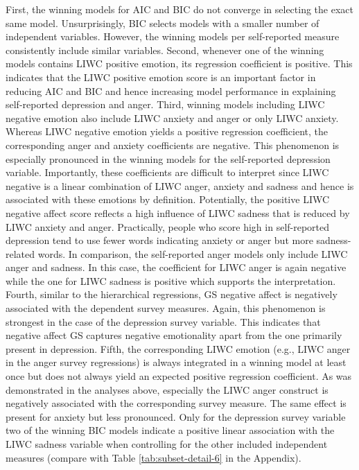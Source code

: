 \documentclass[
  english,
  jou,floatsintext]{apa7}
\begin{document}
First, the winning models for AIC and BIC do not converge in selecting the exact same model. Unsurprisingly, BIC selects models with a smaller number of independent variables. However, the winning models per self-reported measure consistently include similar variables. Second, whenever one of the winning models contains LIWC positive emotion, its regression coefficient is positive. This indicates that the LIWC positive emotion score is an important factor in reducing AIC and BIC and hence increasing model performance in explaining self-reported depression and anger.
Third, winning models including LIWC negative emotion also include LIWC anxiety and anger or only LIWC anxiety. Whereas LIWC negative emotion yields a positive regression coefficient, the corresponding anger and anxiety coefficients are negative. This phenomenon is especially pronounced in the winning models for the self-reported depression variable.
Importantly, these coefficients are difficult to interpret since LIWC negative is a linear combination of LIWC anger, anxiety and sadness and hence is associated with these emotions by definition. Potentially, the positive LIWC negative affect score reflects a high influence of LIWC sadness that is reduced by LIWC anxiety and anger. Practically, people who score high in self-reported depression tend to use fewer words indicating anxiety or anger but more sadness-related words. In comparison, the self-reported anger models only include LIWC anger and sadness. In this case, the coefficient for LIWC anger is again negative while the one for LIWC sadness is positive which supports the interpretation.
Fourth, similar to the hierarchical regressions, GS negative affect is negatively associated with the dependent survey measures. Again, this phenomenon is strongest in the case of the depression survey variable. This indicates that negative affect GS captures negative emotionality apart from the one primarily present in depression.
Fifth, the corresponding LIWC emotion (e.g., LIWC anger in the anger survey regressions) is always integrated in a winning model at least once but does not always yield an expected positive regression coefficient. As was demonstrated in the analyses above, especially the LIWC anger construct is negatively associated with the corresponding survey measure. The same effect is present for anxiety but less pronounced. Only for the depression survey variable two of the winning BIC models indicate a positive linear association with the LIWC sadness variable when controlling for the other included independent measures (compare with Table \ref{tab:subset-detail-6} in the Appendix).
\end{document}
